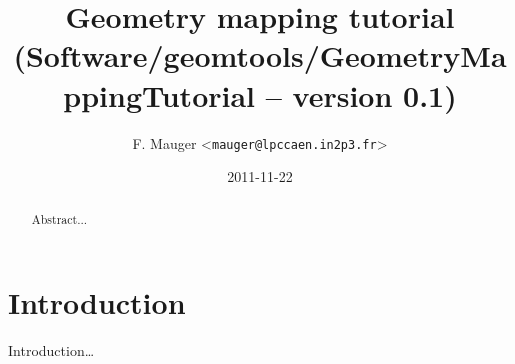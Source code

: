 \documentclass[a4paper,12pt]{article}
\title{Geometry mapping tutorial\\%
{\small{(Software/geomtools/GeometryMappingTutorial -- version 0.1)}}}
\author{F. Mauger <\texttt{mauger@lpccaen.in2p3.fr}>}
\date{2011-11-22}
\newcommand{\basepath}{.}
\newcommand{\codingpath}{\basepath/coding}
\newcommand{\pn}{\par\noindent}
\begin{document}
\maketitle

\begin{abstract}
Abstract...
\end{abstract}

\tableofcontents

\section{Introduction}

\pn Introduction\dots

\pagebreak



\pagebreak


\pagebreak


\pagebreak






\end{document}
